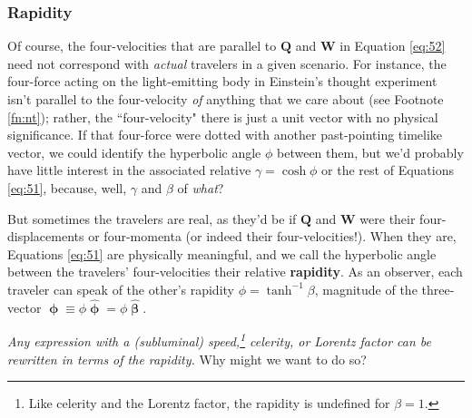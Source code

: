\documentclass[12pt]{article}
\renewcommand{\vv}[1]{\mathbf{#1}}
\newcommand{\hatbeta}{\bm{\hat{\upbeta}}}
\newcommand{\vvphi}{\bm{\upphi}}
\newcommand{\hatphi}{\bm{\hat{\upphi}}}
\begin{document}
\subsubsection{Rapidity}

Of course, the four-velocities that are parallel to $\vv Q$ and $\vv W$ in Equation \ref{eq:52} need not correspond with \emph{actual} travelers in a given scenario. For instance, the four-force acting on the light-emitting body in Einstein's thought experiment isn't parallel to the four-velocity \emph{of} anything that we care about (see Footnote \ref{fn:nt}); rather, the ``four-velocity" there is just a unit vector with no physical significance. If that four-force were dotted with another past-pointing timelike vector, we could identify the hyperbolic angle $\phi$ between them, but we'd probably have little interest in the associated relative $\gamma = \cosh{\phi}$ or the rest of Equations \ref{eq:51}, because, well, $\gamma$ and $\beta$ of \emph{what}?

But sometimes the travelers are real, as they'd be if $\vv Q$ and $\vv W$ were their four-displacements or four-momenta (or indeed their four-velocities!). When they are, Equations \ref{eq:51} are physically meaningful, and we call the hyperbolic angle between the travelers' four-velocities their relative \textbf{rapidity}. As an observer, each traveler can speak of the other's rapidity $\phi = \tanh^{-1}{\beta}$, magnitude of the three-vector $\vvphi \equiv \phi \hatphi = \phi \hatbeta$.

\emph{Any expression with a (subluminal) speed,\footnote{Like celerity and the Lorentz factor, the rapidity is undefined for $\beta = 1$.} celerity, or Lorentz factor can be rewritten in terms of the rapidity.} Why might we want to do so?
\end{document}
